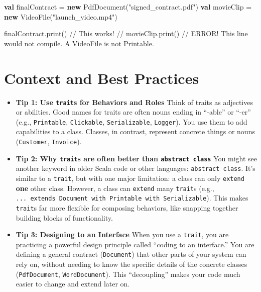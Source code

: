 \documentclass[
  letterpaper,
  DIV=11,
  numbers=noendperiod]{scrreprt}
\newenvironment{Shaded}{\begin{snugshade}}{\end{snugshade}}
\newcommand{\CommentTok}[1]{\textcolor[rgb]{0.37,0.37,0.37}{#1}}
\newcommand{\FunctionTok}[1]{\textcolor[rgb]{0.28,0.35,0.67}{#1}}
\newcommand{\KeywordTok}[1]{\textcolor[rgb]{0.00,0.23,0.31}{\textbf{#1}}}
\newcommand{\NormalTok}[1]{\textcolor[rgb]{0.00,0.23,0.31}{#1}}
\newcommand{\OperatorTok}[1]{\textcolor[rgb]{0.37,0.37,0.37}{#1}}
\newcommand{\StringTok}[1]{\textcolor[rgb]{0.13,0.47,0.30}{#1}}
\begin{document}
\begin{Shaded}
\begin{Highlighting}[]
\KeywordTok{val}\NormalTok{ finalContract }\OperatorTok{=} \KeywordTok{new} \FunctionTok{PdfDocument}\OperatorTok{(}\StringTok{"signed\_contract.pdf"}\OperatorTok{)}
\KeywordTok{val}\NormalTok{ movieClip }\OperatorTok{=} \KeywordTok{new} \FunctionTok{VideoFile}\OperatorTok{(}\StringTok{"launch\_video.mp4"}\OperatorTok{)}

\NormalTok{finalContract}\OperatorTok{.}\FunctionTok{print}\OperatorTok{()} \CommentTok{// This works!}
\CommentTok{// movieClip.print()  // ERROR! This line would not compile. A VideoFile is not Printable.}
\end{Highlighting}
\end{Shaded}

\section{Context and Best Practices}\label{context-and-best-practices}

\begin{itemize}
\item
  \textbf{Tip 1: Use \texttt{trait}s for Behaviors and Roles} Think of
  traits as adjectives or abilities. Good names for traits are often
  nouns ending in ``-able'' or ``-er'' (e.g., \texttt{Printable},
  \texttt{Clickable}, \texttt{Serializable}, \texttt{Logger}). You use
  them to add capabilities to a class. Classes, in contrast, represent
  concrete things or nouns (\texttt{Customer}, \texttt{Invoice}).
\item
  \textbf{Tip 2: Why \texttt{trait}s are often better than
  \texttt{abstract\ class}} You might see another keyword in older Scala
  code or other languages: \texttt{abstract\ class}. It's similar to a
  \texttt{trait}, but with one major limitation: a class can only
  \texttt{extend} \textbf{one} other class. However, a class can
  \texttt{extend} many \texttt{trait}s (e.g.,
  \texttt{...\ extends\ Document\ with\ Printable\ with\ Serializable}).
  This makes \texttt{trait}s far more flexible for composing behaviors,
  like snapping together building blocks of functionality.
\item
  \textbf{Tip 3: Designing to an Interface} When you use a
  \texttt{trait}, you are practicing a powerful design principle called
  ``coding to an interface.'' You are defining a general contract
  (\texttt{Document}) that other parts of your system can rely on,
  without needing to know the specific details of the concrete classes
  (\texttt{PdfDocument}, \texttt{WordDocument}). This ``decoupling''
  makes your code much easier to change and extend later on.
\end{itemize}
\end{document}
